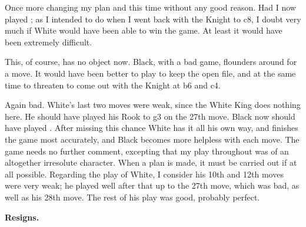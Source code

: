 \documentclass[10pt,twoside]{article}
\begin{document}

Once more changing my plan and this time without any good reason. Had I now played ; as I intended to do when I went back with the Knight to c8, I doubt very much if White would have been able to win the game. At least it would have been extremely difficult.


This, of course, has no object now. Black, with a bad game, flounders around for a move. It would have been better to play  to keep the open file, and at the same time to threaten to come out with the Knight at b6 and c4.


Again bad. White's last two moves were weak, since the White King does nothing here. He should have played his Rook to g3 on the 27th move. Black now should have played . After missing this chance White has it all his own way, and finishes the game most accurately, and Black becomes more helpless with each move. The game needs no further comment, excepting that my play throughout was of an altogether irresolute character. When a plan is made, it must be carried out if at all possible. Regarding the play of White, I consider his 10th and 12th moves were very weak; he played well after that up to the 27th move, which was bad, as well as his 28th move. The rest of his play was good, probably perfect.


\noindent\textbf{Resigns.}
\end{document}
